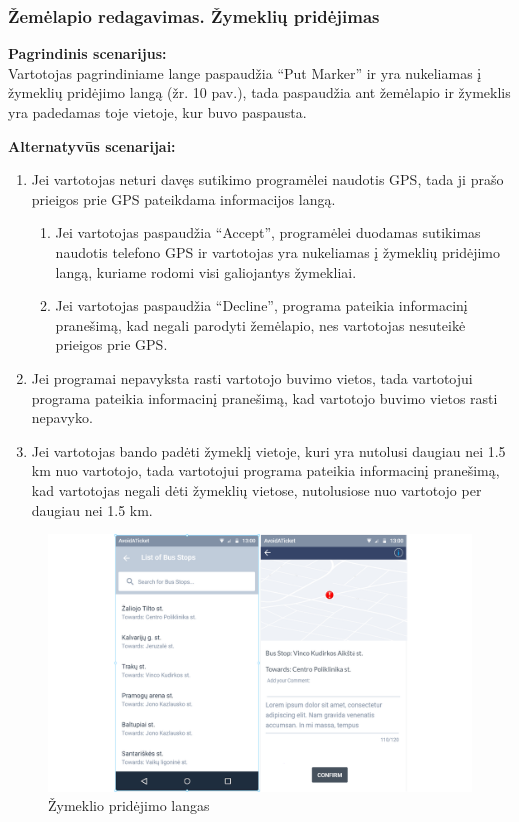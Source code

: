 \documentclass{VUMIFPSkursinis}
\begin{document}
\subsubsection{Žemėlapio redagavimas. Žymeklių pridėjimas}
	\textbf{Pagrindinis scenarijus:}\\
	Vartotojas pagrindiniame lange paspaudžia “Put Marker” ir yra nukeliamas į žymeklių pridėjimo langą (žr. 10 pav.), tada paspaudžia ant žemėlapio ir žymeklis yra padedamas toje vietoje, kur buvo paspausta.

	\textbf{Alternatyvūs scenarijai:}
	\begin{enumerate}[itemsep=-2mm]
		\item Jei vartotojas neturi davęs sutikimo programėlei naudotis GPS, tada ji prašo prieigos prie GPS pateikdama informacijos langą.
		\begin{enumerate}[itemsep=-2mm]
			\item Jei vartotojas paspaudžia “Accept”, programėlei duodamas sutikimas naudotis telefono GPS ir vartotojas yra nukeliamas į žymeklių pridėjimo langą, kuriame rodomi visi galiojantys žymekliai.
			\item Jei vartotojas paspaudžia “Decline”, programa pateikia informacinį pranešimą, kad negali parodyti žemėlapio, nes vartotojas nesuteikė prieigos prie GPS.
		\end{enumerate} 
		\item Jei programai nepavyksta rasti vartotojo buvimo vietos, tada vartotojui programa pateikia informacinį pranešimą, kad vartotojo buvimo vietos rasti nepavyko.
		\item Jei vartotojas bando padėti žymeklį vietoje, kuri yra nutolusi daugiau nei 1.5 km nuo vartotojo, tada vartotojui programa pateikia informacinį pranešimą, kad vartotojas negali dėti žymeklių vietose, nutolusiose nuo vartotojo per daugiau nei 1.5 km.
	\end{enumerate} 
	\begin{figure}[H]
				\centering
				\includegraphics[scale=0.2]{img/mockup_AddMarker}
				\caption{Žymeklio pridėjimo langas}
				\label{img:Žymeklio pridėjimo langas}
			\end{figure}
\end{document}
